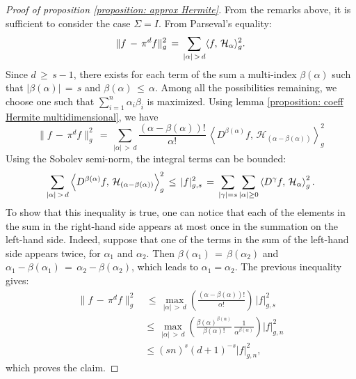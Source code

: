 \iflong\begin{proof}[Proof of proposition \ref{proposition: approx Hermite}]
    From the remarks above, it is sufficient to consider the case $\Sigma= I$. From Parseval's equality:
    $$
        \| f\,-\, \pi^d f\|_{g}^2 \,=\,\sum_{|\alpha|\,>\,d} \langle f,\, \mathcal H_{\alpha} \rangle_g^2.
    $$
    Since $d\, \geq \,s-1$, there exists for each term of the sum a multi-index
    $\beta(\alpha)$ such that $|\beta(\alpha)|\,=\,s$ and $\beta(\alpha)\, \leq \,\alpha$.
    Among all the possibilities remaining, we choose one such that
    $\sum^{n}_{i=1} \alpha_i \beta_i$ is maximized.  Using lemma
    \ref{proposition: coeff Hermite multidimensional}, we have
    $$
        \| f\,-\, \pi^df\|_{g}^2
        \,=\,\sum_{|\alpha|\,>\,d}\frac
                {(\alpha-\beta(\alpha))!}{\alpha!} \,\left\langle
            D^{\beta(\alpha)}f,\,\mathcal H_{(\alpha-\beta(\alpha))}\right\rangle_g^2
    $$
    Using the Sobolev semi-norm, the integral terms can be bounded:
    $$
        \sum_{|\alpha|\,>\,d} \left\langle D^{\beta(\alpha)}f,\,\mathcal H_{(\alpha-\beta(\alpha))}\right\rangle_g^2
        \, \leq \, |f|_{g,s}^2 \,=\, \sum_{|\gamma| = s}\sum_{|\alpha| \geq 0} \left\langle D^{\gamma}f,\,\mathcal H_{\alpha}\right\rangle_g^2.
    $$
    To show that this inequality is true, one can notice that each of the
    elements in the sum in the right-hand side appears at most once in the
    summation on the left-hand side. Indeed, suppose that one of the terms in
    the sum of the left-hand side appears twice, for ${\alpha}_1$ and ${\alpha}_2$.
    Then ${\beta}({\alpha}_1) \,=\, {\beta}({\alpha}_2)$ and ${\alpha}_1 -{\beta}({\alpha}_1)
    \,=\,{\alpha}_2 - {\beta}({\alpha}_2)$, which leads to ${\alpha}_1 = {\alpha}_2$.  The previous inequality gives:
    $$
        \begin{aligned}
        \| f\,-\, \pi^d f\|_{g}^2 &\, \leq \,\max_{|\alpha|\,>\,d}\left({\frac
                {(\alpha-\beta(\alpha))!}{\alpha!}}\right) \, |f|_{g,s}^2 \\
            & \leq \, \max_{|\alpha|\,>\,d}\left(\frac{\beta(\alpha)^{\beta(\alpha)}}{\beta(\alpha)!}\,\frac
                1{\alpha^{\beta(\alpha)}}\right) |f|_{g,n}^2 \\
            & \leq (sn)^s(d+1)^{-s}|f|_{g,n}^2,
        \end{aligned}
    $$
    which proves the claim.
\end{proof} \fi
